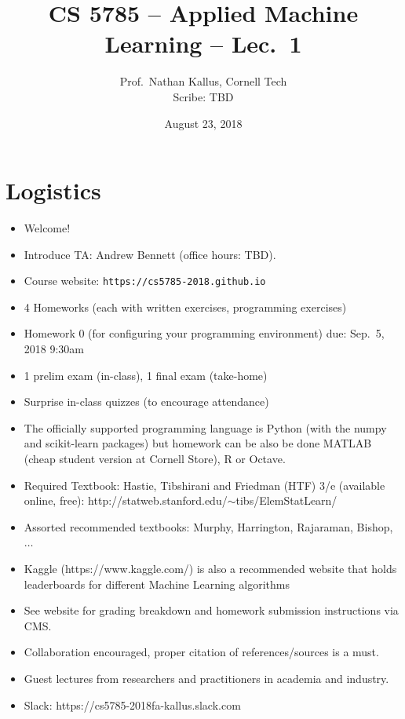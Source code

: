 \documentclass[a4paper]{article}
\title{CS 5785 -- Applied Machine Learning -- Lec.\ 1}
\author{Prof.\ Nathan Kallus, Cornell Tech
\\Scribe: TBD}
\date{August 23, 2018}
\begin{document}
\maketitle


\section{Logistics}

\begin{itemize}
\item Welcome!
\item Introduce TA: Andrew Bennett (office hours: TBD).
\item Course website: {\tt https://cs5785-2018.github.io}
\item 4 Homeworks (each with written exercises, programming exercises)
\item Homework 0 (for configuring your programming environment) due: Sep.~5, 2018 9:30am
\item 1 prelim exam (in-class), 1 final exam (take-home)
\item Surprise in-class quizzes (to encourage attendance)
\item The officially supported programming language is Python (with the numpy and scikit-learn packages) but homework can be also be done MATLAB (cheap student version at Cornell Store), R or Octave.
\item Required Textbook: Hastie, Tibshirani and Friedman (HTF) 3/e (available online, free): http://statweb.stanford.edu/$\sim$tibs/ElemStatLearn/
\item Assorted recommended textbooks: Murphy, Harrington, Rajaraman, Bishop, $\ldots$
\item Kaggle (https://www.kaggle.com/) is also a recommended website that holds leaderboards for different Machine Learning algorithms
\item See website for grading breakdown and homework submission instructions via CMS.
\item Collaboration encouraged, proper citation of references/sources is a must.
\item Guest lectures from researchers and practitioners in academia and industry.
\item Slack: https://cs5785-2018fa-kallus.slack.com 

\end{itemize}
\end{document}
